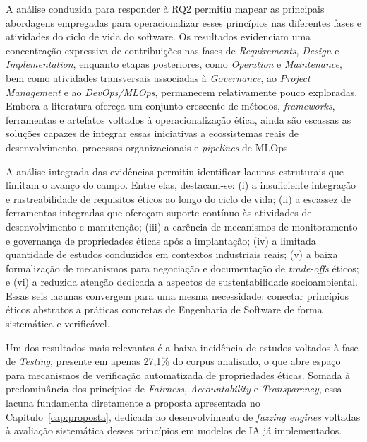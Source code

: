 A análise conduzida para responder à RQ2 permitiu mapear as principais abordagens empregadas para operacionalizar esses princípios nas diferentes fases e atividades do ciclo de vida do software. Os resultados evidenciam uma concentração expressiva de contribuições nas fases de \textit{Requirements}, \textit{Design} e \textit{Implementation}, enquanto etapas posteriores, como \textit{Operation} e \textit{Maintenance}, bem como atividades transversais associadas à \textit{Governance}, ao \textit{Project Management} e ao \textit{DevOps/MLOps}, permanecem relativamente pouco exploradas. Embora a literatura ofereça um conjunto crescente de métodos, \textit{frameworks}, ferramentas e artefatos voltados à operacionalização ética, ainda são escassas as soluções capazes de integrar essas iniciativas a ecossistemas reais de desenvolvimento, processos organizacionais e \textit{pipelines} de MLOps.

A análise integrada das evidências permitiu identificar lacunas estruturais que limitam o avanço do campo. Entre elas, destacam-se: (i) a insuficiente integração e rastreabilidade de requisitos éticos ao longo do ciclo de vida; (ii) a escassez de ferramentas integradas que ofereçam suporte contínuo às atividades de desenvolvimento e manutenção; (iii) a carência de mecanismos de monitoramento e governança de propriedades éticas após a implantação; (iv) a limitada quantidade de estudos conduzidos em contextos industriais reais; (v) a baixa formalização de mecanismos para negociação e documentação de \textit{trade-offs} éticos; e (vi) a reduzida atenção dedicada a aspectos de sustentabilidade socioambiental. Essas seis lacunas convergem para uma mesma necessidade: conectar princípios éticos abstratos a práticas concretas de Engenharia de Software de forma sistemática e verificável.

Um dos resultados mais relevantes é a baixa incidência de estudos voltados à fase de \textit{Testing}, presente em apenas 27,1\% do corpus analisado, o que abre espaço para mecanismos de verificação automatizada de propriedades éticas. Somada à predominância dos princípios de \textit{Fairness}, \textit{Accountability} e \textit{Transparency}, essa lacuna fundamenta diretamente a proposta apresentada no Capítulo~\ref{cap:proposta}, dedicada ao desenvolvimento de \textit{fuzzing engines} voltadas à avaliação sistemática desses princípios em modelos de IA já implementados.

